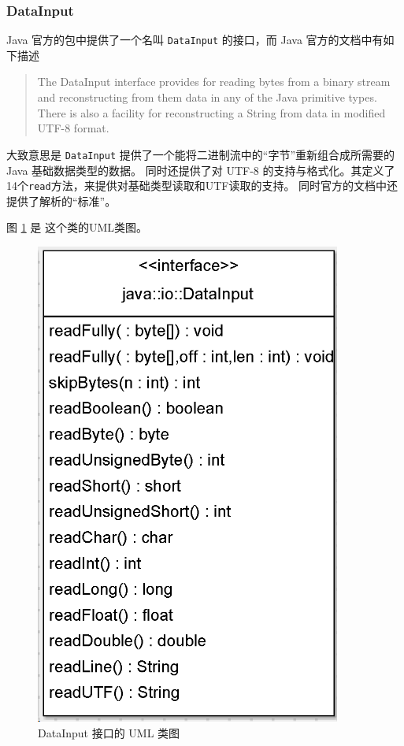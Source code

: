 
\subsubsection{DataInput}
\label{sec:uml:input:datainput}

Java 官方的包中提供了一个名叫 \lstinline|DataInput| 的接口，而 Java 官方的文档中有如下描述
\begin{quote}
    The DataInput interface provides for reading bytes from a binary stream and reconstructing from them
    data in any of the Java primitive types. There is also a facility for reconstructing a String from
    data in modified UTF-8 format. 
\end{quote}

大致意思是 \lstinline|DataInput| 提供了一个能将二进制流中的“字节”重新组合成所需要的 Java 基础数据类型的数据。
同时还提供了对 UTF-8 的支持与格式化。其定义了14个\lstinline|read|方法，来提供对基础类型读取和UTF读取的支持。
同时官方的文档中还提供了解析的“标准”。

图 \ref{fig:datainput} 是 这个类的UML类图。
\begin{figure}
\centering
\includegraphics[width=1\linewidth]{UML/inputstream/datainput}
\caption{DataInput 接口的 UML 类图}
\label{fig:datainput}
\end{figure}

